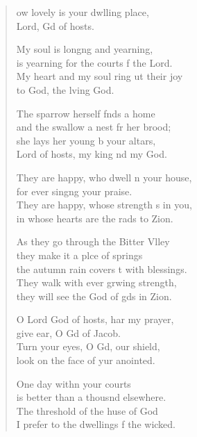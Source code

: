 \settowidth{\versewidth}{They are happy, whose strength is in you, *}
\begin{verse}%
  \begin{patverse}
ow lovely is your dwlling place,\Med\\
Lord, Gd of hosts.

My soul is long\pointup{\i}ng and yearning,\Med\\
is yearning for the courts f the Lord.\\
My heart and my soul ring ut their joy\Med\\
to God, the l\pointup{\i}ving God.

The sparrow herself f\pointup{\i}nds a home\Med\\
and the swallow a nest fr her brood;\\
she lays her young b your altars,\Med\\
Lord of hosts, my king nd my God.

They are happy, who dwell \pointup{\i}n your house,\Med\\
for ever sing\pointup{\i}ng your praise.\\
They are happy, whose strength \pointup{\i}s in you,\Med\\
in whose hearts are the rads to Zion.

As they go through the Bitter Vlley\Flex\\
they make it a plce of springs\Med\\
the autumn rain covers \pointup{\i}t with blessings.\\
They walk with ever grwing strength,\Med\\
they will see the God of gds in Zion.

O Lord God of hosts, har my prayer,\Med\\
give ear, O Gd of Jacob.\\
Turn your eyes, O Gd, our shield,\Med\\
look on the face of yur anointed.

One day with\pointup{\i}n your courts\Med\\
is better than a thousnd elsewhere.\\
The threshold of the huse of God\Med\\
I prefer to the dwellings f the wicked.


\end{patverse}
\end{verse}
